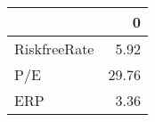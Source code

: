 \begin{tabular}{lr}
\toprule
{} &      0 \\
\midrule
RiskfreeRate &   5.92 \\
P/E          &  29.76 \\
ERP          &   3.36 \\
\bottomrule
\end{tabular}
